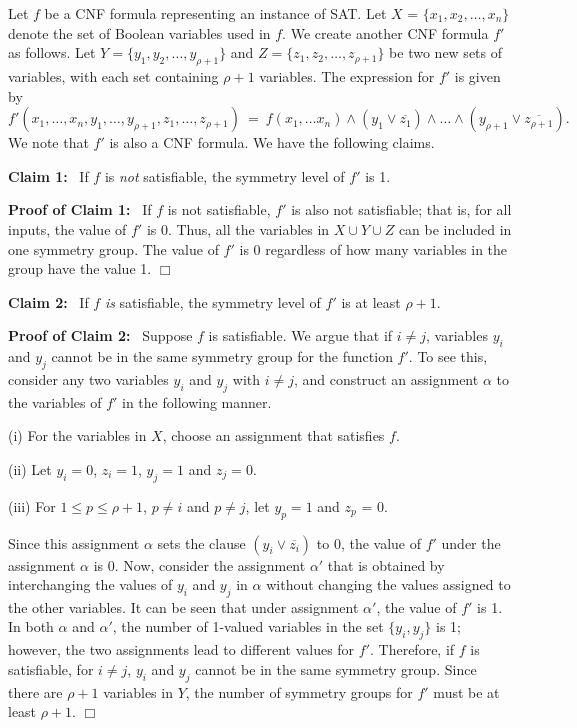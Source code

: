 Let $f$ be a CNF formula representing an instance of SAT.
Let $X$ = $\{x_1, x_2, \ldots, x_n\}$ denote the set of
Boolean variables used in $f$.
We create another CNF formula $f'$ as follows.
Let $Y = \{y_1, y_2, \ldots, y_{\rho+1}\}$ and
$Z = \{z_1, z_2, \ldots, z_{\rho+1}\}$ be two 
new sets of variables, with each set containing $\rho+1$ variables.
The expression for $f'$ is given by
\[
f'(x_1, \ldots, x_n, y_1, \ldots, y_{\rho+1},
z_1, \ldots, z_{\rho+1}) ~=~ 
    f(x_1, \ldots x_n) \wedge (y_1 \vee \overline{z_1}) \wedge \ldots \wedge
                              (y_{\rho+1} \vee \overline{z_{\rho+1}}).
\]
We note that $f'$ is also a CNF formula.
We have the following claims.

\medskip

\noindent
\textbf{Claim 1:}~ If $f$ is \emph{not} satisfiable, 
the symmetry level of $f'$ is 1.

\smallskip

\noindent
\textbf{Proof of Claim 1:}~ If $f$ is not satisfiable, $f'$ is also
not satisfiable; that is, for all inputs, the value of $f'$ is 0.
Thus, all the variables in $X \cup Y \cup Z$ can be included in one
symmetry group.
The value of $f'$ is 0 regardless of how many variables in the
group have the value 1.  \hfill$\Box$

\medskip

\noindent
\textbf{Claim 2:}~ If $f$ \emph{is} satisfiable, 
the symmetry level of $f'$ is at least $\rho+1$.

\smallskip

\noindent
\textbf{Proof of Claim 2:}~ Suppose $f$ is satisfiable.
We argue that if $i \neq j$, variables $y_i$ and $y_j$
cannot be in the same symmetry group for the function $f'$.
To see this, consider any two variables $y_i$ and $y_j$ with $i \neq j$,
and construct an assignment $\alpha$ to
the variables of $f'$ in the following manner.
\begin{description}
\item{(i)} For the variables in $X$, choose an assignment that
satisfies $f$.
\item{(ii)} Let $y_i = 0$, $z_i = 1$, $y_j = 1$ and $z_j = 0$.
\item{(iii)} For $1 \leq p \leq \rho+1$, $p \neq i$ and $p \neq j$,
let $y_p = 1$ and $z_p$ = 0.
\end{description}
Since this assignment $\alpha$ sets the clause $(y_i \vee \overline{z_i})$ to 0,
the value of $f'$ under the assignment $\alpha$ is 0.
Now, consider the assignment $\alpha'$ that is obtained by interchanging
the values of $y_i$ and $y_j$ in $\alpha$ without changing the
values assigned to the other variables. 
It can be seen that under assignment $\alpha'$, the value of $f'$ is 1.
In both $\alpha$ and $\alpha'$, the number of 1-valued variables in 
the set $\{y_i, y_j\}$ is 1; however, the two assignments lead to 
different values for $f'$.
Therefore, if $f$ is satisfiable, for $i \neq j$, $y_i$ and $y_j$ cannot
be in the same symmetry group.
Since there are $\rho+1$ variables in $Y$, the number of symmetry groups 
for $f'$ must be at least $\rho+1$. \hfill$\Box$

